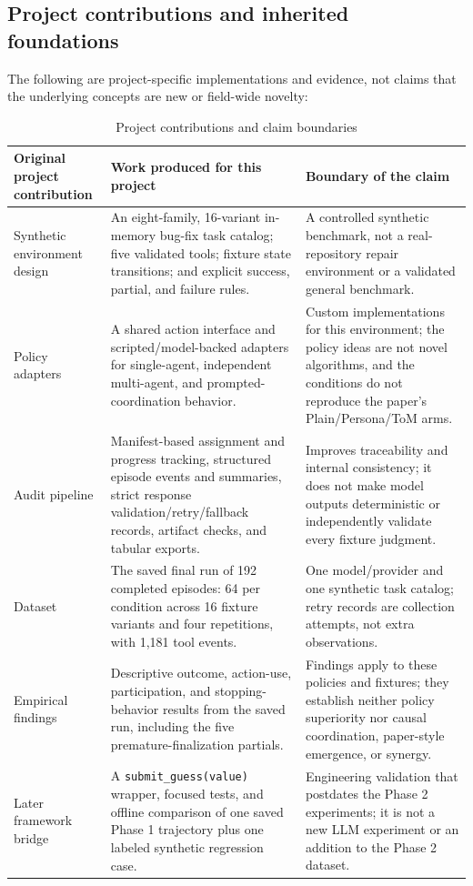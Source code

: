 \documentclass[12pt,a4paper,oneside]{report}
\begin{document}
\subsection{Project contributions and inherited foundations}
The following are project-specific implementations and evidence, not claims that the underlying concepts are new or field-wide novelty:

\begin{table}[htbp]
\centering
\small
\setlength{\tabcolsep}{4pt}
\begin{tabularx}{\linewidth}{|Y|Y|Y|}
\hline
\textbf{Original project contribution} & \textbf{Work produced for this project} & \textbf{Boundary of the claim} \\
\hline
Synthetic environment design & An eight-family, 16-variant in-memory bug-fix task catalog; five validated tools; fixture state transitions; and explicit success, partial, and failure rules. & A controlled synthetic benchmark, not a real-repository repair environment or a validated general benchmark. \\
\hline
Policy adapters & A shared action interface and scripted/model-backed adapters for single-agent, independent multi-agent, and prompted-coordination behavior. & Custom implementations for this environment; the policy ideas are not novel algorithms, and the conditions do not reproduce the paper’s Plain/Persona/ToM arms. \\
\hline
Audit pipeline & Manifest-based assignment and progress tracking, structured episode events and summaries, strict response validation/retry/fallback records, artifact checks, and tabular exports. & Improves traceability and internal consistency; it does not make model outputs deterministic or independently validate every fixture judgment. \\
\hline
Dataset & The saved final run of 192 completed episodes: 64 per condition across 16 fixture variants and four repetitions, with 1,181 tool events. & One model/provider and one synthetic task catalog; retry records are collection attempts, not extra observations. \\
\hline
Empirical findings & Descriptive outcome, action-use, participation, and stopping-behavior results from the saved run, including the five premature-finalization partials. & Findings apply to these policies and fixtures; they establish neither policy superiority nor causal coordination, paper-style emergence, or synergy. \\
\hline
Later framework bridge & A \texttt{submit\allowbreak\_guess(value)} wrapper, focused tests, and offline comparison of one saved Phase 1 trajectory plus one labeled synthetic regression case. & Engineering validation that postdates the Phase 2 experiments; it is not a new LLM experiment or an addition to the Phase 2 dataset. \\
\hline
\end{tabularx}
\caption{Project contributions and claim boundaries}
\end{table}
\end{document}
